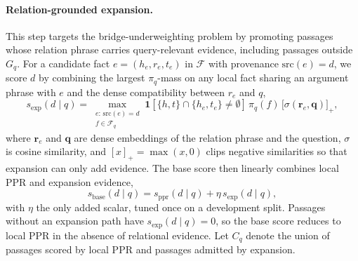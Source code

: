 \paragraph{Relation-grounded expansion.}
This step targets the bridge-underweighting problem by promoting
passages whose relation phrase carries query-relevant evidence,
including passages outside $G_q$. For a candidate fact
$e=(h_e, r_e, t_e)$ in $\mathcal{F}$ with provenance
$\mathrm{src}(e)=d$, we score $d$ by combining the largest
$\pi_q$-mass on any local fact sharing an argument phrase with $e$
and the dense compatibility between $r_e$ and $q$,
\begin{equation}
\label{eq:expansion-score}
s_{\mathrm{exp}}(d \mid q)
=
\max_{\substack{e:\,\mathrm{src}(e)=d \\ f \in \mathcal{F}_q}}
\mathbf{1}\!\left[\{h,t\}\cap\{h_e,t_e\}\neq\emptyset\right]
\,\pi_q(f)\,\bigl[\sigma(\mathbf{r}_e,\mathbf{q})\bigr]_{+},
\end{equation}
where $\mathbf{r}_e$ and $\mathbf{q}$ are dense embeddings of the
relation phrase and the question, $\sigma$ is cosine similarity, and
$[x]_{+}=\max(x,0)$ clips negative similarities so that expansion can
only add evidence. The base score then linearly combines local PPR
and expansion evidence,
\begin{equation}
\label{eq:base-score}
s_{\mathrm{base}}(d \mid q)
=
s_{\mathrm{ppr}}(d \mid q)
+
\eta\,s_{\mathrm{exp}}(d \mid q),
\end{equation}
with $\eta$ the only added scalar, tuned once on a development split.
Passages without an expansion path have
$s_{\mathrm{exp}}(d \mid q)=0$, so the base score reduces to local PPR
in the absence of relational evidence. Let $C_q$ denote the union of
passages scored by local PPR and passages admitted by expansion.

